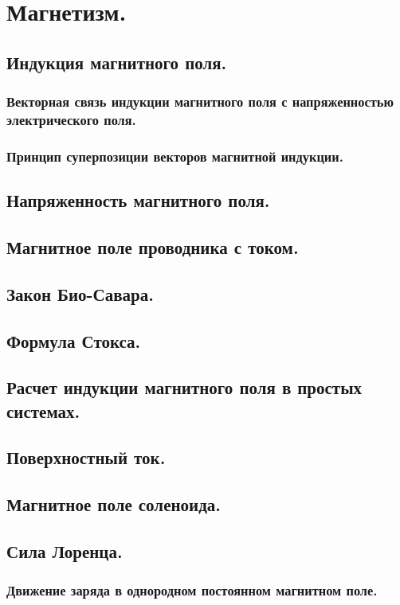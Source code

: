 \documentclass{article}
\begin{document}
\section{Магнетизм.}
    \subsection{Индукция магнитного поля.}
        \subsubsection{Векторная связь индукции магнитного поля с напряженностью электрического поля.}
        \subsubsection{Принцип суперпозиции векторов магнитной индукции.}
    \subsection{Напряженность магнитного поля.}
    \subsection{Магнитное поле проводника с током.}
    \subsection{Закон Био-Савара.}
    \subsection{Формула Стокса.}
    \subsection{Расчет индукции магнитного поля в простых системах.}
    \subsection{Поверхностный ток.}
    \subsection{Магнитное поле соленоида.}
    \subsection{Сила Лоренца.}
        \subsubsection{Движение заряда в однородном постоянном магнитном поле.}
\end{document}
